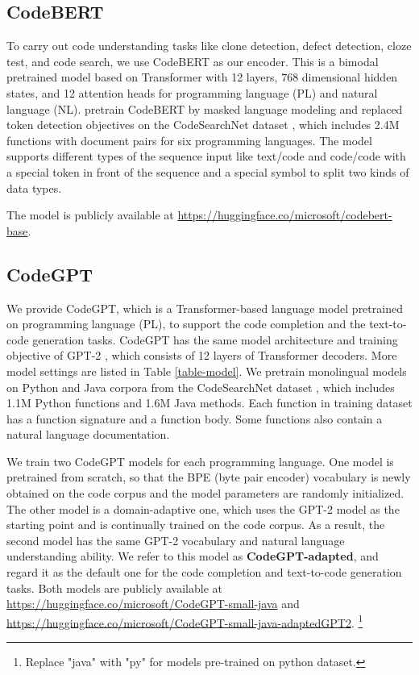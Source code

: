 \documentclass[sigconf,nonacm,screen]{acmart}
\begin{document}
\subsection{CodeBERT}
To carry out code understanding tasks like clone detection, defect detection, cloze test, and code search, we use CodeBERT \cite{feng2020codebert} as our encoder. 
This is a bimodal pretrained model based on Transformer with 12 layers, 768 dimensional hidden states, and 12 attention heads for programming language (PL) and natural language (NL). 
\citet{feng2020codebert} pretrain CodeBERT by masked language modeling and replaced token detection objectives on the CodeSearchNet dataset \cite{husain2019codesearchnet}, which includes 2.4M functions with document pairs for six programming languages. 
The model supports different types of the sequence input like text/code and code/code with a special token   in front of the sequence and a special symbol  to split two kinds of data types. 

The model is publicly available at \url{https://huggingface.co/microsoft/codebert-base}.



\subsection{CodeGPT}\label{section:codeGPT}
We provide CodeGPT, 
which is a Transformer-based language model pretrained on programming language (PL), to support the code completion and the text-to-code generation tasks. CodeGPT has the same model architecture and training objective of GPT-2 \cite{radford2019language}, which consists of 12 layers of Transformer decoders. More model settings are listed in Table \ref{table-model}. We pretrain monolingual models on Python and Java corpora from the CodeSearchNet dataset \cite{husain2019codesearchnet}, which includes 1.1M Python functions and 1.6M Java methods. Each function in training dataset has a function signature and a function body. Some functions also contain a natural language documentation. 

We train two CodeGPT models for each programming language. One model is pretrained from scratch, so that the BPE (byte pair encoder) \cite{sennrich2016bpe} vocabulary is newly obtained on the code corpus and the model parameters are randomly initialized. The other model is a domain-adaptive one, which uses the GPT-2 model as the starting point and is continually trained on the code corpus. As a result, the second model has the same GPT-2 vocabulary and natural language understanding ability. 
We refer to this model as \textbf{CodeGPT-adapted}, and regard it as the default one for the code completion and text-to-code generation tasks. 
Both models are publicly available at \url{https://huggingface.co/microsoft/CodeGPT-small-java} and \url{https://huggingface.co/microsoft/CodeGPT-small-java-adaptedGPT2}. \footnote{Replace "java" with "py" for models pre-trained on python dataset.}
\end{document}
